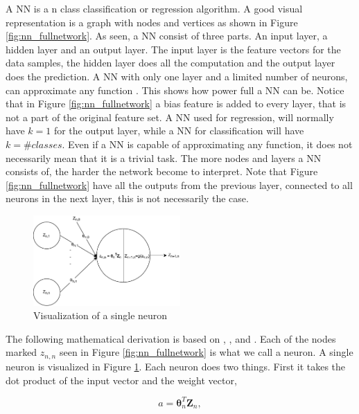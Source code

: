             
            
            A NN is a n class classification or regression algorithm. A good visual representation is a graph with nodes and vertices as shown in Figure \ref{fig:nn_fullnetwork}. As seen, a NN consist of three parts. An input layer, a hidden layer and an output layer. The input layer is the feature vectors for the data samples, the hidden layer does all the computation and the output layer does the prediction. A NN with only one layer and a limited number of neurons, can approximate any function \cite{Hastie}. This shows how power full a NN can be. Notice that in Figure \ref{fig:nn_fullnetwork} a bias feature is added to every layer, that is not a part of the original feature set. A NN used for regression, will normally have $k=1$ for the output layer, while a NN for classification will have $k=\textit{\#classes}$. Even if a NN is capable of approximating any function, it does not necessarily mean that it is a trivial task. The more nodes and layers a NN consists of, the harder the network become to interpret. Note that Figure \ref{fig:nn_fullnetwork} have all the outputs from the previous layer, connected to all neurons in the next layer, this is not necessarily the case.
            
            
            \begin{figure}[h]
                \centering
                \includegraphics[width=0.5\textwidth]{figures/machineLearning/single_neuron.pdf}
                \caption{Visualization of a single neuron}
                \label{fig:nn_neuron}
            \end{figure}
            
            The following mathematical derivation is based on \cite{Hastie}, \cite{Ng}, and \cite{Nga}. Each of the nodes marked  $z_{n,n}$ seen in Figure \ref{fig:nn_fullnetwork} is what we call a neuron. A single neuron is visualized in Figure \ref{fig:nn_neuron}. Each neuron does two things. First it takes the dot product of the input vector and the weight vector, 
            
            \begin{equation}
                a = \bm \theta_n^T \bm Z_n,
                \label{eq:neuron_a}
            \end{equation}
            
